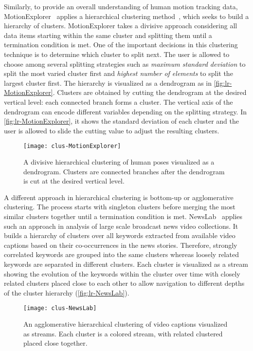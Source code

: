 Similarly, to provide an overall understanding of human motion tracking data, MotionExplorer~\cite{Bernard2013} applies a hierarchical clustering method~\cite{Han2011}, which seeks to build a hierarchy of clusters. MotionExplorer takes a divisive approach considering all data items starting within the same cluster and splitting them until a termination condition is met. One of the important decisions in this clustering technique is to determine which cluster to split next. The user is allowed to choose among several splitting strategies such as \emph{maximum standard deviation} to split the most varied cluster first and \emph{highest number of elements} to split the largest cluster first. The hierarchy is visualized as a dendrogram as in \autoref{fig:lr-MotionExplorer}. Clusters are obtained by cutting the dendrogram at the desired vertical level: each connected branch forms a cluster. The vertical axis of the dendrogram can encode different variables depending on the splitting strategy. In \autoref{fig:lr-MotionExplorer}, it shows the standard deviation of each cluster and the user is allowed to slide the cutting value to adjust the resulting clusters.

\begin{figure}[!htb]
	\centering
	\texttt{[image: clus-MotionExplorer]}
	\caption{A divisive hierarchical clustering of human poses visualized as a dendrogram. Clusters are connected branches after the dendrogram is cut at the desired vertical level. }
	\label{fig:lr-MotionExplorer}
\end{figure}

A different approach in hierarchical clustering is bottom-up or agglomerative clustering. The process starts with singleton clusters before merging the most similar clusters together until a termination condition is met. NewsLab~\cite{Ghoniem2007} applies such an approach in analysis of large scale broadcast news video collections. It builds a hierarchy of clusters over all keywords extracted from available video captions based on their co-occurrences in the news stories. Therefore, strongly correlated keywords are grouped into the same clusters whereas loosely related keywords are separated in different clusters. Each cluster is visualized as a stream showing the evolution of the keywords within the cluster over time with closely related clusters placed close to each other to allow navigation to different depths of the cluster hierarchy (\autoref{fig:lr-NewsLab}).

\begin{figure}[!htb]
	\centering
	\texttt{[image: clus-NewsLab]}
	\caption{An agglomerative hierarchical clustering of video captions visualized as streams. Each cluster is a colored stream, with related clustered placed close together. }
	\label{fig:lr-NewsLab}
\end{figure}

